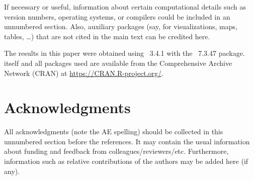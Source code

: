 \documentclass[article]{jss}\usepackage{knitr}
\begin{document}
\begin{leftbar}
If necessary or useful, information about certain computational details
such as version numbers, operating systems, or compilers could be included
in an unnumbered section. Also, auxiliary packages (say, for visualizations,
maps, tables, \dots) that are not cited in the main text can be credited here.
\end{leftbar}

The results in this paper were obtained using
~3.4.1 with the
~7.3.47 package.  itself
and all packages used are available from the Comprehensive
 Archive Network (CRAN) at
\url{https://CRAN.R-project.org/}.


\section*{Acknowledgments}

\begin{leftbar}
All acknowledgments (note the AE spelling) should be collected in this
unnumbered section before the references. It may contain the usual information
about funding and feedback from colleagues/reviewers/etc. Furthermore,
information such as relative contributions of the authors may be added here
(if any).
\end{leftbar}







\newpage
\end{document}
